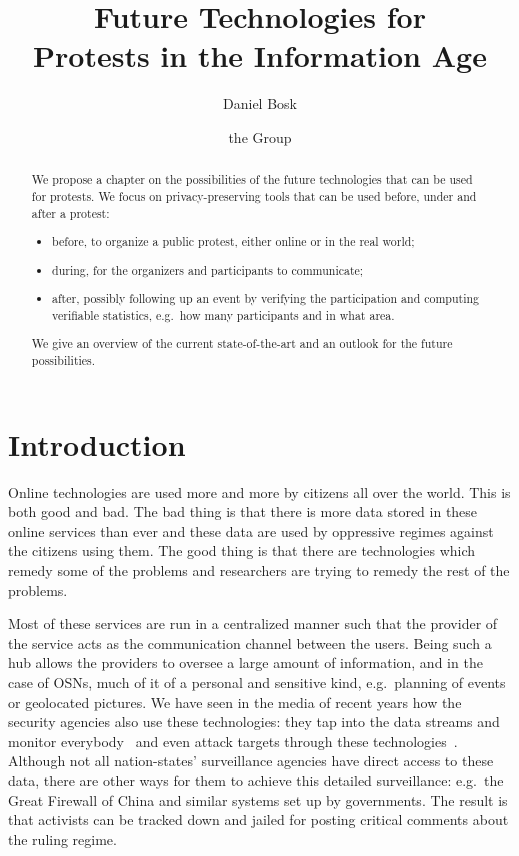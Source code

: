 \documentclass[a4paper]{llncs}
\title{%
  Future Technologies for\\
  Protests in the Information Age
}
\author{%
  Daniel Bosk
  \and
  the Group
}
\institute{%
  School of Computer Science and Communication,\\
  KTH Royal Institute of Technology,
  Stockholm\\
  \email{dbosk@kth.se}
}
\begin{document}
\maketitle

\begin{abstract}
  We propose a chapter on the possibilities of the future technologies that can 
  be used for protests.
  We focus on privacy-preserving tools that can be used before, under and after 
  a protest:
  \begin{itemize}
    \item before, to organize a public protest, either online or in the real 
      world;
    \item during, for the organizers and participants to communicate;
    \item after, possibly following up an event by verifying the participation 
      and computing verifiable statistics, e.g.\ how many participants and in 
      what area.
  \end{itemize}
  We give an overview of the current state-of-the-art and an outlook for the 
  future possibilities.
\end{abstract}


\section{Introduction}

Online technologies are used more and more by citizens all over the world.
This is both good and bad.
The bad thing is that there is more data stored in these online services than 
ever and these data are used by oppressive regimes against the citizens using 
them.
The good thing is that there are technologies which remedy some of the problems 
and researchers are trying to remedy the rest of the problems.

Most of these services are run in a centralized manner such that the provider 
of the service acts as the communication channel between the users.
Being such a hub allows the providers to oversee a large amount of information, 
and in the case of \acp{OSN}, much of it of a personal and sensitive kind, 
e.g.\ planning of events or geolocated pictures.
We have seen in the media of recent years how the security agencies also use 
these technologies: they tap into the data streams and monitor 
everybody~\cite{BoundlessInformant,XKeyscore} and even attack targets through 
these technologies~\cite{Quantum}.
Although not all nation-states' surveillance agencies have direct access to 
these data, there are other ways for them to achieve this detailed 
surveillance: e.g.\ the Great Firewall of China and similar systems set up by 
governments.
The result is that activists can be tracked down and jailed for posting 
critical comments about the ruling regime.
\end{document}
